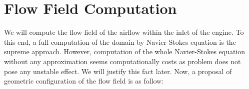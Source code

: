 \documentclass{book}
\begin{document}
\chapter{Flow Field Computation}

We will compute the flow field of the airflow within the inlet of the engine. To this end, a full-computation of the domain by Navier-Stokes equation is the supreme approach. However, computation of the whole Navier-Stokes equation without any approximation seems computationally costs as problem does not pose any unstable effect. We will justify this fact later. Now, a proposal of geometric configuration of the flow field is as follow:
\beg
\end{document}
